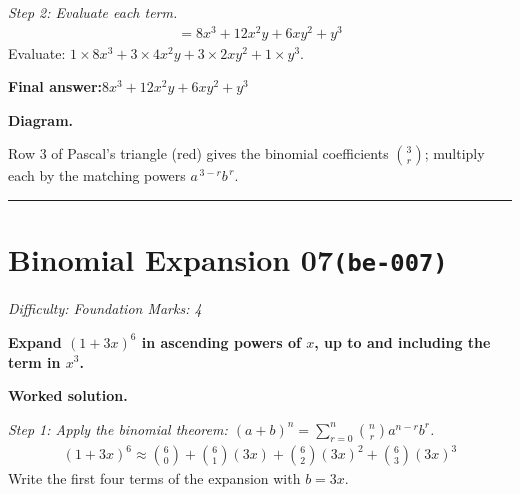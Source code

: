 \documentclass[11pt]{article}
\newcommand{\question}[1]{\par\medskip\noindent\textbf{#1}\par}
\begin{document}
\textit{Step 2: Evaluate each term.}
\[\begin{gathered}
= 8x^3 + 12x^2 y + 6xy^2 + y^3
\end{gathered}\]
Evaluate: \(1 \times 8x^3 + 3 \times 4x^2 y + 3 \times 2xy^2 + 1 \times y^3\).

\begin{answerbox}
\textbf{Final answer:}\quad \(\displaystyle 8x^3 + 12x^2 y + 6xy^2 + y^3\)
\end{answerbox}
\textbf{Diagram.}

\begin{center}
\end{center}
\small Row $3$ of Pascal's triangle (red) gives the binomial coefficients $\binom{3}{r}$; multiply each by the matching powers $a^{\,3-r}b^{\,r}$.\normalsize

\medskip\hrule

\section*{Binomial Expansion 07\quad\small\texttt{(be-007)}}
\textit{Difficulty: Foundation \quad\textbar\quad Marks: 4}

\question{Expand \( (1 + 3x)^6 \) in ascending powers of \( x \), up to and including the term in \( x^3 \).}

\textbf{Worked solution.}

\textit{Step 1: Apply the binomial theorem: \((a+b)^n = \sum_{r=0}^{n} \binom{n}{r} a^{n-r} b^r\).}
\[\begin{gathered}
(1+3x)^6 \approx \binom{6}{0} + \binom{6}{1}(3x) + \binom{6}{2}(3x)^2 + \binom{6}{3}(3x)^3
\end{gathered}\]
Write the first four terms of the expansion with \(b = 3x\).
\end{document}
